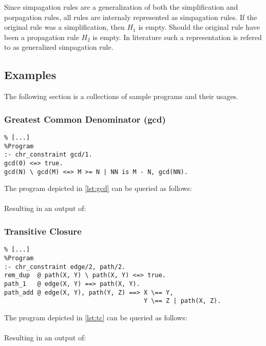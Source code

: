 \noindent Since simpagation rules are a generalization of both the simplification and porpagation rules, all rules are internaly represented as simpagation rules.
If the original rule was a simplification, then $H_1$ is empty.
Should the original rule have been a propagation rule $H_2$ is empty.
In literature such a representation is refered to as generalized simpagation rule.

\subsection{Examples}
The following section is a collections of sample programs and their usages.

\subsubsection{Greatest Common Denominator (gcd)}

\begin{lstlisting}[frame=single, caption=chr program for calculating the greatest common denominator, label={lst:gcd}]
%Imports
% [...]
%Program
:- chr_constraint gcd/1.
gcd(0) <=> true.
gcd(N) \ gcd(M) <=> M >= N | NN is M - N, gcd(NN).
\end{lstlisting}
The program depicted in \ref{lst:gcd} can be queried as follows:\\
\\
Resulting in an output of:\\
\inlineCode{[gcd(3)]}

\subsubsection{Transitive Closure}

\begin{lstlisting}[frame=single, caption=chr program for calculating the transitive closure of a graph, label={lst:tc}]
%Imports
% [...]
%Program
:- chr_constraint edge/2, path/2.
rem_dup  @ path(X, Y) \ path(X, Y) <=> true.
path_1   @ edge(X, Y) ==> path(X, Y).
path_add @ edge(X, Y), path(Y, Z) ==> X \== Y,
                                      Y \== Z | path(X, Z).
\end{lstlisting}
The program depicted in \ref{lst:tc} can be queried as follows:\\
\\
Resulting in an output of:\\
\newpage